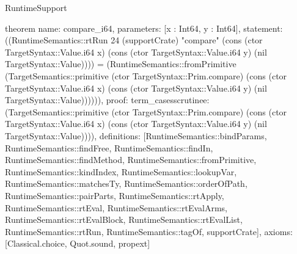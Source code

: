 \begin{lexlean}{RuntimeSupport}
\begin{semanticmodule}
theorem{
  name: compare_i64,
  parameters: [x : Int64, y : Int64],
  statement: ((RuntimeSemantics::rtRun 24 (supportCrate) "compare" (cons (ctor TargetSyntax::Value.i64 x) (cons (ctor TargetSyntax::Value.i64 y) (nil TargetSyntax::Value)))) = (RuntimeSemantics::fromPrimitive (TargetSemantics::primitive (ctor TargetSyntax::Prim.compare) (cons (ctor TargetSyntax::Value.i64 x) (cons (ctor TargetSyntax::Value.i64 y) (nil TargetSyntax::Value)))))),
  proof: term_cases{scrutinee: (TargetSemantics::primitive (ctor TargetSyntax::Prim.compare) (cons (ctor TargetSyntax::Value.i64 x) (cons (ctor TargetSyntax::Value.i64 y) (nil TargetSyntax::Value)))), definitions: [RuntimeSemantics::bindParams, RuntimeSemantics::findFree, RuntimeSemantics::findIn, RuntimeSemantics::findMethod, RuntimeSemantics::fromPrimitive, RuntimeSemantics::kindIndex, RuntimeSemantics::lookupVar, RuntimeSemantics::matchesTy, RuntimeSemantics::orderOfPath, RuntimeSemantics::pairParts, RuntimeSemantics::rtApply, RuntimeSemantics::rtEval, RuntimeSemantics::rtEvalArms, RuntimeSemantics::rtEvalBlock, RuntimeSemantics::rtEvalList, RuntimeSemantics::rtRun, RuntimeSemantics::tagOf, supportCrate]},
  axioms: [Classical.choice, Quot.sound, propext]
}
\end{semanticmodule}
\end{lexlean}
